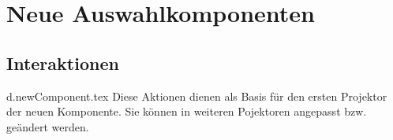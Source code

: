 \chapter{Neue Auswahlkomponenten}

\section{Interaktionen}
{d.newComponent.tex}
Diese Aktionen dienen als Basis für den ersten Projektor der neuen Komponente. 
Sie können in weiteren Pojektoren angepasst bzw. geändert werden.